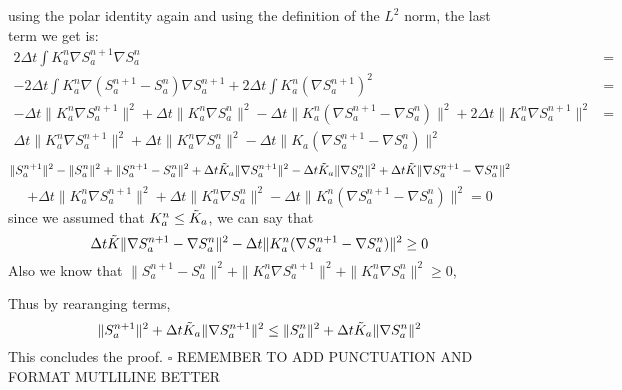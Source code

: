 using the polar identity again and using the definition of the $L^2$ norm, the
last term we get is:
\begin{align*}
	2 \Delta t \int K_a^{n} \nabla S_a^{n+1} \nabla S_a^{n} &= \\
	-2 \Delta t \int K_a^n \nabla(S_a^{n+1} - S_a^n)\nabla
	S_a^{n+1} + 2 \Delta t \int K_a^n (\nabla S_a^{n+1})^2 &= \\-\Delta t \|
	K_a^{n} \nabla S_a^{n+1} \|^2 + \Delta t \| K_a^n \nabla S_a^n \|^2 -
	\Delta t \| K_a^n(\nabla S_a^{n+1} - \nabla S_a^n) \|^2 + 2 \Delta t \|
	K_a^n \nabla S_a^{n+1} \|^2 &= \\ \Delta t \| K_a^n \nabla S_a^{n+1}
	\|^2 + \Delta t \| K_a^n \nabla S_a^n \|^2 - \Delta t \| K_a(\nabla
	S_a^{n+1} - \nabla S_a^n) \|^2
\end{align*}
\[
\| S_a^{n+1} \|^2-\| S_a^{n} \|^2 + \| S_a^{n+1} - S_a^{n} \|^2+
\Delta t \Tilde{K}_a \|\nabla S_a^{n+1} \|^2-   \Delta t
\Tilde{K}_a \| \nabla S_a^{n} \|^2 + \Delta t \Tilde{K} \|
\nabla S_a^{n+1} - \nabla S_a^{n} \|^2
\]
\[
+ \Delta t \| K_a^n \nabla S_a^{n+1}
\|^2 + \Delta t \| K_a^n \nabla S_a^n \|^2 - \Delta t \| K_a^n(\nabla
S_a^{n+1} - \nabla S_a^n) \|^2 = 0
\]
since we assumed that $ K_a^n \leq \Tilde{K}_a$, we can say that 
\[
\Delta t \Tilde{K} \|
\nabla S_a^{n+1} - \nabla S_a^{n} \|^2  - \Delta t \| K_a^n(\nabla
S_a^{n+1} - \nabla S_a^n) \|^2 \geq 0
\]
Also we know that $ \| S_a^{n+1} - S_a^{n} \|^2 + \| K_a^n \nabla S_a^{n+1}
\|^2 + \| K_a^n \nabla S_a^n \|^2  \geq 0$,

Thus by rearanging terms,
\[
\| S_a^{n+1} \|^2 +\Delta t \Tilde{K}_a \|\nabla S_a^{n+1} \|^2 \leq
\| S_a^{n} \|^2 +  \Delta t
\Tilde{K}_a \| \nabla S_a^{n} \|^2 
\]
This concludes the proof. $\square$
REMEMBER TO ADD PUNCTUATION AND FORMAT MUTLILINE BETTER

